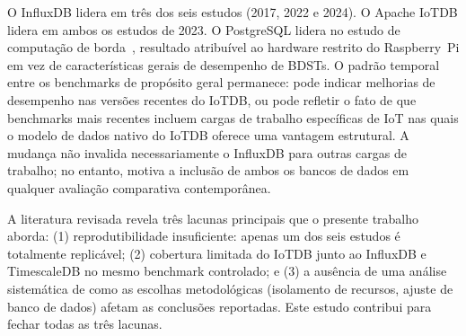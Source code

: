 O InfluxDB lidera em três dos seis estudos (2017, 2022 e 2024). O Apache IoTDB lidera em
ambos os estudos de 2023. O PostgreSQL lidera no estudo de computação de
borda~\citep{grzesik2020comparative}, resultado atribuível ao hardware restrito do
Raspberry~Pi em vez de características gerais de desempenho de BDSTs. O padrão temporal entre
os benchmarks de propósito geral permanece: pode indicar melhorias de desempenho nas
versões recentes do IoTDB, ou pode refletir o fato de que benchmarks mais recentes incluem
cargas de trabalho específicas de IoT nas quais o modelo de dados nativo do IoTDB oferece uma
vantagem estrutural. A mudança não invalida necessariamente o InfluxDB para outras cargas de
trabalho; no entanto, motiva a inclusão de ambos os bancos de dados em qualquer avaliação
comparativa contemporânea.

A literatura revisada revela três lacunas principais que o presente trabalho aborda:
(1) reprodutibilidade insuficiente: apenas um dos seis estudos é totalmente replicável;
(2) cobertura limitada do IoTDB junto ao InfluxDB e TimescaleDB no mesmo benchmark controlado;
e (3) a ausência de uma análise sistemática de como as escolhas metodológicas (isolamento de
recursos, ajuste de banco de dados) afetam as conclusões reportadas. Este estudo contribui para
fechar todas as três lacunas.
